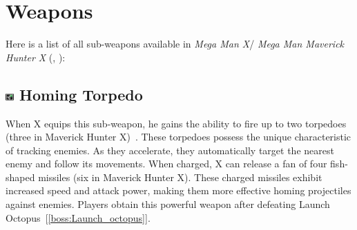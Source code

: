 \section{Weapons}\label{X1:sub_weapon}
Here is a list of all sub-weapons available in\textit{ Mega Man X}/ \textit{Mega Man Maverick Hunter X} (\cite{MHX:manual}, \cite{wiki:X_weapons}):

\subsection{\includegraphics[width=12px, height=10px]{figures/X1/weapons/Homig_T.jpg} Homing Torpedo}\label{Homing_torpedo}
When X equips this sub-weapon, he gains the ability to fire up to two torpedoes (three in Maverick Hunter X)~\cite{wiki:Homing_torpedo}. These torpedoes possess the unique characteristic of tracking enemies. As they accelerate, they automatically target the nearest enemy and follow its movements. When charged, X can release a fan of four fish-shaped missiles (six in Maverick Hunter X). These charged missiles exhibit increased speed and attack power, making them more effective homing projectiles against enemies. Players obtain this powerful weapon after defeating Launch Octopus~[\ref{boss:Launch_octopus}].

